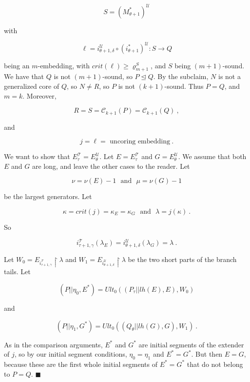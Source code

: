 \documentclass[12pt]{article}
\begin{document}
\[
S = (M_{\theta + 1}^*)^{\mathscr{U}}
\]

with

\[
\ell = i_{\theta + 1 , \delta}^{\mathscr{U}} \circ ( i_{\theta + 1}^*)^{\mathscr{U}} : S \longrightarrow Q
\]

being an $m$-embedding, with $crit ( \ell) \geq \varrho_{m+1}^S$, and $S$ being $(m + 1)$-sound.\\

We have that $Q$ is not $(m+1)$-sound, so $P \unlhd Q$.  By the subclaim, $N$ is not a generalized core of $Q$, so $N \neq R$, so $P$ is not $(k+1)$-sound.  Thus $P=Q$, and $m=k$.  Moreover,

\[
R = S = \mathcal{C}_{k+1} (P) = \mathcal{C}_{k+1} (Q) \ ,
\]

and

\[
j = \ell = \text{ uncoring embedding} \ .
\]

We want to show that $E_\tau^{\mathscr{T}} = E_\theta^{\mathscr{U}}$.  Let $E = E_\tau^{\mathscr{T}}$ and $G = E_\theta^{\mathscr{U}}$.  We assume that both $E$ and $G$ are long, and leave the other cases to the reader.  Let

\[
\nu = \nu (E) - 1 \ \ \ \text{and} \ \ \ \mu = \nu (G) - 1
\]

be the largest generators.  Let

\[
\kappa = crit (j) = \kappa_E = \kappa_G \ \ \ \text{and} \ \ \ \lambda = j(\kappa) \ .
\]

So

\[
i_{\tau + 1, \gamma}^{\mathscr{T}} (\lambda_E) = i_{\theta + 1 , \delta }^{\mathscr{U}} (\lambda_G ) = \lambda \ .
\]

Let $W_0 = E_{i_{\tau + 1 , \gamma}^{\mathscr{T}}} \restriction \lambda$ and $W_1 = E_{i_{\theta + 1 , \delta }^{\mathscr{U}}} \restriction \lambda$ be the two short parts of the branch tails.  Let

\[
( P || \eta_0 , E^* ) = Ult_0 (( P_\tau || lh(E) , E ) , W_0 )
\]

and

\[
( P || \eta_1 , G^* ) = Ult_0 (( Q_\theta || lh(G), G), W_1 ) \ .
\]

As in the comparison arguments, $E^*$ and $G^*$ are initial segments of the extender of $j$, so by our initial segment conditions, $\eta_0 = \eta_1$ and $E^* = G^*$.  But then $E = G$, because these are the first whole initial segments of $E^* = G^*$ that do not belong to $P = Q$. $\blacksquare$\\
\end{document}
